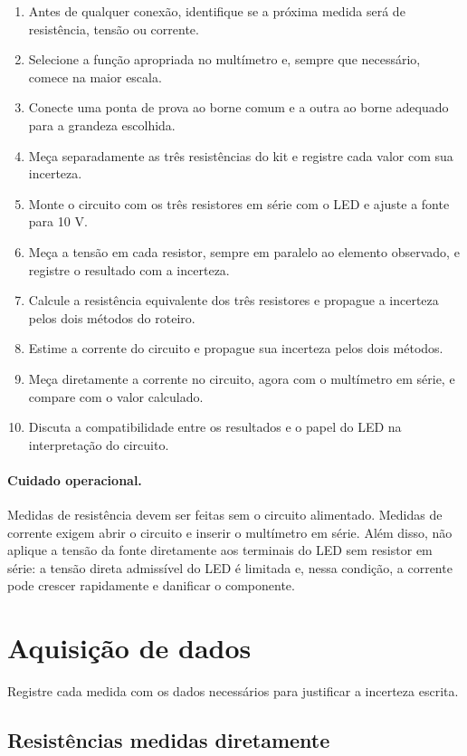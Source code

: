 \documentclass[12pt,a4paper]{article}
\begin{document}
\begin{enumerate}
  \item Antes de qualquer conexão, identifique se a próxima medida será de resistência, tensão ou corrente.
  \item Selecione a função apropriada no multímetro e, sempre que necessário, comece na maior escala.
  \item Conecte uma ponta de prova ao borne comum e a outra ao borne adequado para a grandeza escolhida.
  \item Meça separadamente as três resistências do kit e registre cada valor com sua incerteza.
  \item Monte o circuito com os três resistores em série com o LED e ajuste a fonte para 10 V.
  \item Meça a tensão em cada resistor, sempre em paralelo ao elemento observado, e registre o resultado com a incerteza.
  \item Calcule a resistência equivalente dos três resistores e propague a incerteza pelos dois métodos do roteiro.
  \item Estime a corrente do circuito e propague sua incerteza pelos dois métodos.
  \item Meça diretamente a corrente no circuito, agora com o multímetro em série, e compare com o valor calculado.
  \item Discuta a compatibilidade entre os resultados e o papel do LED na interpretação do circuito.
\end{enumerate}

\paragraph{Cuidado operacional.}
Medidas de resistência devem ser feitas sem o circuito alimentado. Medidas de corrente exigem abrir o circuito e inserir o multímetro
em série. Além disso, não aplique a tensão da fonte diretamente aos terminais do LED sem resistor em série: a tensão direta
admissível do LED é limitada e, nessa condição, a corrente pode crescer rapidamente e danificar o componente.

\section{Aquisição de dados}

Registre cada medida com os dados necessários para justificar a incerteza escrita.

\subsection{Resistências medidas diretamente}
\end{document}
